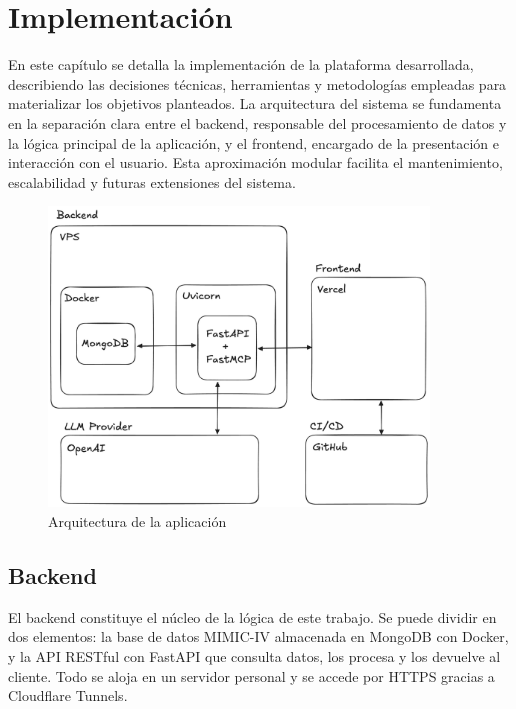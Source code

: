 \chapter{Implementación}

En este capítulo se detalla la implementación de la plataforma desarrollada, describiendo las decisiones técnicas, herramientas y metodologías empleadas para materializar los objetivos planteados. La arquitectura del sistema se fundamenta en la separación clara entre el backend, responsable del procesamiento de datos y la lógica principal de la aplicación, y el frontend, encargado de la presentación e interacción con el usuario. Esta aproximación modular facilita el mantenimiento, escalabilidad y futuras extensiones del sistema.

\begin{figure}[H]
  \centering
  \includegraphics[width=0.9\textwidth]{imagenes/arch1.png}
  \caption{Arquitectura de la aplicación}
  \label{fig:arch1}
\end{figure}

\section{Backend}

El backend constituye el núcleo de la lógica de este trabajo. Se puede dividir en dos elementos: la base de datos MIMIC-IV almacenada en MongoDB con Docker, y la API RESTful con FastAPI que consulta datos, los procesa y los devuelve al cliente. Todo se aloja en un servidor personal y se accede por HTTPS gracias a Cloudflare Tunnels.

